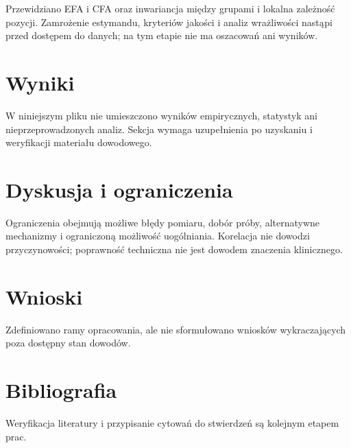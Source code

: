 \documentclass[11pt,a4paper]{article}
\begin{document}
Przewidziano EFA i CFA oraz inwariancja między grupami i lokalna zależność pozycji. Zamrożenie estymandu, kryteriów jakości i analiz wrażliwości nastąpi przed dostępem do danych; na tym etapie nie ma oszacowań ani wyników.

\section{Wyniki}

W niniejszym pliku nie umieszczono wyników empirycznych, statystyk ani nieprzeprowadzonych analiz. Sekcja wymaga uzupełnienia po uzyskaniu i weryfikacji materiału dowodowego.

\section{Dyskusja i ograniczenia}

Ograniczenia obejmują możliwe błędy pomiaru, dobór próby, alternatywne mechanizmy i ograniczoną możliwość uogólniania. Korelacja nie dowodzi przyczynowości; poprawność techniczna nie jest dowodem znaczenia klinicznego.

\section{Wnioski}

Zdefiniowano ramy opracowania, ale nie sformułowano wniosków wykraczających poza dostępny stan dowodów.

\section*{Bibliografia}

Weryfikacja literatury i przypisanie cytowań do stwierdzeń są kolejnym etapem prac.
\end{document}
